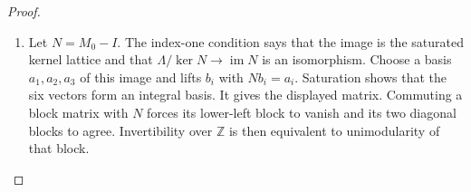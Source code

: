 \documentclass[11pt,a4paper]{article}
\numberwithin{equation}{section}
\theoremstyle{definition}
\begin{document}
\begin{proof}
\begin{enumerate}[label=\arabic*.]
\item Let $N=M_0-I$.  The index-one condition says that the image
is the saturated kernel lattice and that
$\Lambda/\ker N\to\operatorname{im}N$ is an isomorphism.
Choose a basis $a_1,a_2,a_3$ of this image and lifts $b_i$ with
$Nb_i=a_i$.  Saturation shows that the six vectors form an
integral basis.  It gives the displayed matrix.  Commuting a
block matrix with $N$ forces its lower-left block to vanish
and its two diagonal blocks to agree.  Invertibility over
$\mathbb Z$ is then equivalent to unimodularity of that block.

\end{enumerate}
\end{proof}
\end{document}
